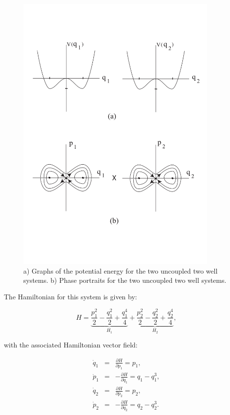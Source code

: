 \documentclass{article}
\begin{document}
\begin{figure}[htb!]
\begin{center}
\includegraphics[width=10.0cm]{global_DS_1.png}
\end{center}
\caption{a) Graphs of the potential energy for the two uncoupled two well systems. b) Phase portraits for the two uncoupled two well systems.}
\label{fig:global DS 1}
\end{figure}

The Hamiltonian for this system is given by:

\begin{equation}
H =\underbrace{\frac{p_1^2}{2} - \frac{q_1^2}{2} + \frac{q_1^4}{4}}_{H_1} +
\underbrace{\frac{p_2^2}{2} - \frac{q_2^2}{2} + \frac{q_2^4}{4}}_{H_2},
\label{hamGDS}
\end{equation}


\noindent
with the associated Hamiltonian vector field:


\begin{eqnarray}
\dot{q}_1 & = & \frac{\partial H}{\partial p_1}=  p_1, \nonumber \\
\dot{p}_1 & = & -\frac{\partial H}{\partial q_1}= q_1 - q_1^3, \nonumber \\
\dot{q}_2 & = & \frac{\partial H}{\partial p_2}=  p_2, \nonumber \\
\dot{p}_2 & = & -\frac{\partial H}{\partial q_2}=  q_2- q_2^3. 
\label{hameqGDS}
\end{eqnarray}
\end{document}
